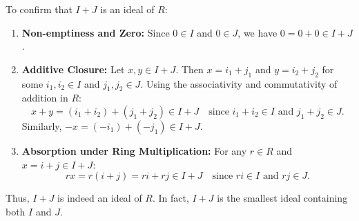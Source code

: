 \begin{content}

\begin{steps}
To confirm that $I + J$ is an ideal of $R$:
\begin{enumerate}[label=\textbf{(\arabic*)}]
    \setcounter{enumi}{0} \item \textbf{Non-emptiness and Zero:} Since $0 \in I$ and $0 \in J$, we have $0 = 0 + 0 \in I + J$.
    \setcounter{enumi}{1} \item \textbf{Additive Closure:} Let $x, y \in I + J$. Then $x = i_1 + j_1$ and $y = i_2 + j_2$ for some $i_1, i_2 \in I$ and $j_1, j_2 \in J$. Using the associativity and commutativity of addition in $R$:
    \[
    x + y = (i_1 + i_2) + (j_1 + j_2) \in I + J \quad \text{since } i_1 + i_2 \in I \text{ and } j_1 + j_2 \in J.
    \]
    Similarly, $-x = (-i_1) + (-j_1) \in I + J$.
    \setcounter{enumi}{2} \item \textbf{Absorption under Ring Multiplication:} For any $r \in R$ and $x = i + j \in I + J$:
    \[
    r x = r (i + j) = r i + r j \in I + J \quad \text{since } r i \in I \text{ and } r j \in J.
    \]
\end{enumerate}
Thus, $I + J$ is indeed an ideal of $R$. In fact, $I + J$ is the smallest ideal containing both $I$ and $J$.
\end{steps}
\end{content}

